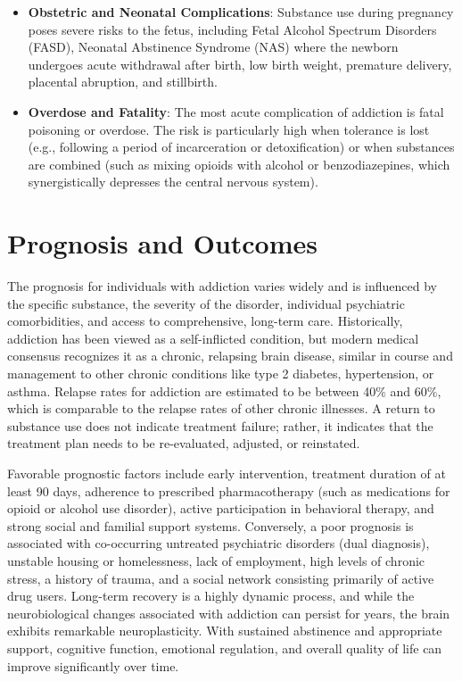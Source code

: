 \begin{itemize}
    \item \textbf{Obstetric and Neonatal Complications}: Substance use during pregnancy poses severe risks to the fetus, including Fetal Alcohol Spectrum Disorders (FASD), Neonatal Abstinence Syndrome (NAS) where the newborn undergoes acute withdrawal after birth, low birth weight, premature delivery, placental abruption, and stillbirth.
    \item \textbf{Overdose and Fatality}: The most acute complication of addiction is fatal poisoning or overdose. The risk is particularly high when tolerance is lost (e.g., following a period of incarceration or detoxification) or when substances are combined (such as mixing opioids with alcohol or benzodiazepines, which synergistically depresses the central nervous system).
\end{itemize}

\section*{Prognosis and Outcomes}
The prognosis for individuals with addiction varies widely and is influenced by the specific substance, the severity of the disorder, individual psychiatric comorbidities, and access to comprehensive, long-term care. Historically, addiction has been viewed as a self-inflicted condition, but modern medical consensus recognizes it as a chronic, relapsing brain disease, similar in course and management to other chronic conditions like type 2 diabetes, hypertension, or asthma. Relapse rates for addiction are estimated to be between 40\% and 60\%, which is comparable to the relapse rates of other chronic illnesses. A return to substance use does not indicate treatment failure; rather, it indicates that the treatment plan needs to be re-evaluated, adjusted, or reinstated.

Favorable prognostic factors include early intervention, treatment duration of at least 90 days, adherence to prescribed pharmacotherapy (such as medications for opioid or alcohol use disorder), active participation in behavioral therapy, and strong social and familial support systems. Conversely, a poor prognosis is associated with co-occurring untreated psychiatric disorders (dual diagnosis), unstable housing or homelessness, lack of employment, high levels of chronic stress, a history of trauma, and a social network consisting primarily of active drug users. Long-term recovery is a highly dynamic process, and while the neurobiological changes associated with addiction can persist for years, the brain exhibits remarkable neuroplasticity. With sustained abstinence and appropriate support, cognitive function, emotional regulation, and overall quality of life can improve significantly over time.

